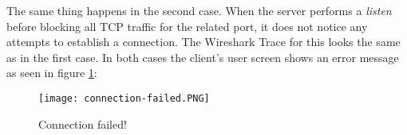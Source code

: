 The same thing happens in the second case. When the server performs a \textit{listen} before blocking all TCP traffic for the related port, it does not notice any attempts to establish a connection. The Wireshark Trace for this looks the same as in the first case. In both cases the client's user screen shows an error message as seen in figure \ref{user-error}:
\begin{figure}[H]
	\centering
	\texttt{[image: connection-failed.PNG]}
	\caption{Connection failed!}
	\label{user-error}
\end{figure}
